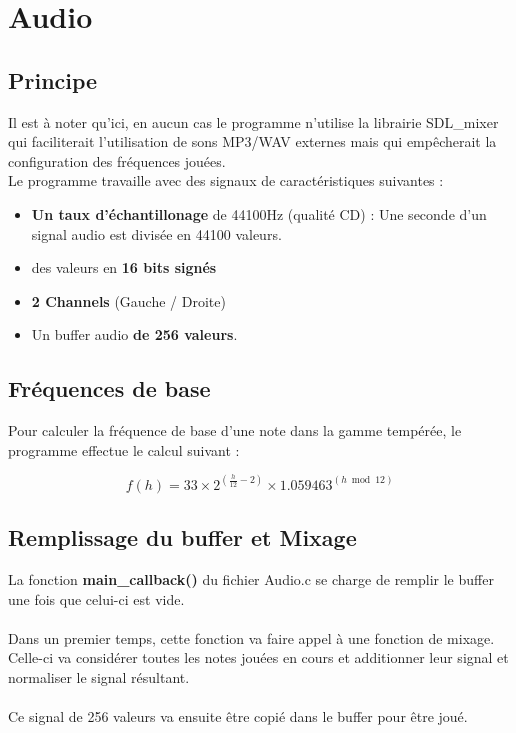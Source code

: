 \documentclass[12pt]{report}
\begin{document}
\newpage
\section{Audio}
\subsection{Principe}
Il est à noter qu'ici, en aucun cas le programme n'utilise la librairie SDL\_mixer qui faciliterait l'utilisation de
sons MP3/WAV externes mais qui empêcherait la configuration des fréquences jouées.\\
Le programme travaille avec des signaux de caractéristiques suivantes :\\
\begin{itemize}
 \item \textbf{Un taux d'échantillonage} de 44100Hz (qualité CD) : Une seconde d'un signal audio est divisée en 44100 valeurs.\\
 \item des valeurs en \textbf{16 bits signés} \\
 \item \textbf{2 Channels} (Gauche / Droite)\\
 \item Un buffer audio \textbf{de 256 valeurs}. \\
\end{itemize}

\subsection{Fréquences de base}
Pour calculer la fréquence de base d'une note dans la gamme tempérée, le programme effectue le calcul suivant :\\
\begin{large}
\[ 
  f(h) = 33 \times {2}^{(\frac{h}{12} - 2)} \times {1.059463}^{(h \bmod 12)}
\]
\end{large}

\subsection{Remplissage du buffer et Mixage}
La fonction \textbf{main\_callback()} du fichier Audio.c se charge de remplir le buffer une fois que celui-ci est vide.\\ \\
Dans un premier temps, cette fonction va faire appel à une fonction de mixage.\\ Celle-ci va considérer toutes les notes
jouées en cours et additionner leur signal et normaliser le signal résultant.\\ \\ Ce signal de 256 valeurs va ensuite être
copié dans le buffer pour être joué.\\\\
\end{document}
